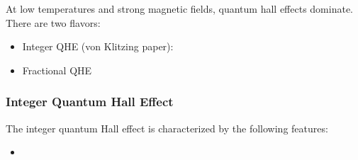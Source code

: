 \documentclass[10pt]{article}
\begin{document}
At low temperatures and strong magnetic fields, quantum hall effects dominate. There are two flavors:
\begin{itemize}
  \item Integer QHE (von Klitzing paper):
  \item Fractional QHE
\end{itemize}

\subsubsection{Integer Quantum Hall Effect}
The integer quantum Hall effect is characterized by the following features:
\begin{itemize}
  \item
\end{itemize}
\end{document}
